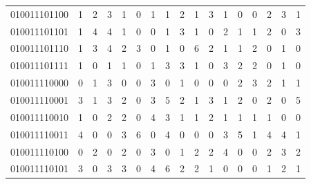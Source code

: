 \documentclass[10pt,a4paper]{article}
\begin{document}
\begin{longtable}{ |c|c|c|c|c|c|c|c|c|c|c|c|c|c|c|c|c| }
    010011101100              & 1                            & 2                                & 3                            & 1                              & 0   & 1   & 1   & 2   & 1   & 3   & 1   & 0   & 0   & 2   & 3   & 1   \\
    010011101101              & 1                            & 4                                & 4                            & 1                              & 0   & 0   & 1   & 3   & 1   & 0   & 2   & 1   & 1   & 2   & 0   & 3   \\
    010011101110              & 1                            & 3                                & 4                            & 2                              & 3   & 0   & 1   & 0   & 6   & 2   & 1   & 1   & 2   & 0   & 1   & 0   \\
    010011101111              & 1                            & 0                                & 1                            & 1                              & 0   & 1   & 3   & 3   & 1   & 0   & 3   & 2   & 2   & 0   & 1   & 0   \\
    010011110000              & 0                            & 1                                & 3                            & 0                              & 0   & 3   & 0   & 1   & 0   & 0   & 0   & 2   & 3   & 2   & 1   & 1   \\
    010011110001              & 3                            & 1                                & 3                            & 2                              & 0   & 3   & 5   & 2   & 1   & 3   & 1   & 2   & 0   & 2   & 0   & 5   \\
    010011110010              & 1                            & 0                                & 2                            & 2                              & 0   & 4   & 3   & 1   & 1   & 2   & 1   & 1   & 1   & 1   & 0   & 0   \\
    010011110011              & 4                            & 0                                & 0                            & 3                              & 6   & 0   & 4   & 0   & 0   & 0   & 3   & 5   & 1   & 4   & 4   & 1   \\
    010011110100              & 0                            & 2                                & 0                            & 2                              & 0   & 3   & 0   & 1   & 2   & 2   & 4   & 0   & 0   & 2   & 3   & 2   \\
    010011110101              & 3                            & 0                                & 3                            & 3                              & 0   & 4   & 6   & 2   & 2   & 1   & 0   & 0   & 0   & 1   & 2   & 1   \\

\end{longtable}
\end{document}
